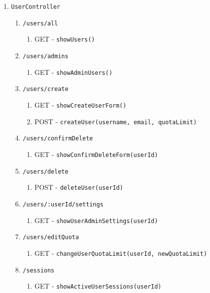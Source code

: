 \documentclass[12pt,DIV14,BCOR10mm,a4paper,parskip=half-,headsepline,headinclude,english,ngerman,bibliography=totocnumbered]{scrreprt}
\begin{document}
\begin{enumerate}
\begin{enumerate}
    \item \texttt{UserController}
    \begin{enumerate}
      \item \texttt{/users/all}
      \begin{enumerate}
        \item GET - \texttt{showUsers()}
      \end{enumerate}
      \item \texttt{/users/admins}
      \begin{enumerate}
        \item GET - \texttt{showAdminUsers()}
      \end{enumerate}
      \item \texttt{/users/create}
      \begin{enumerate}
        \item GET - \texttt{showCreateUserForm()}
        \item POST - \texttt{createUser(username, email, quotaLimit)}
      \end{enumerate}
      \item \texttt{/users/confirmDelete}
      \begin{enumerate}
        \item GET - \texttt{showConfirmDeleteForm(userId)}
      \end{enumerate}
      \item \texttt{/users/delete}
      \begin{enumerate}
        \item POST - \texttt{deleteUser(userId)}
      \end{enumerate}
      \item \texttt{/users/:userId/settings}
      \begin{enumerate}
        \item GET - \texttt{showUserAdminSettings(userId)}
      \end{enumerate}
      \item \texttt{/users/editQuota}
      \begin{enumerate}
        \item GET - \texttt{changeUserQuotaLimit(userId,
        newQuotaLimit)}
      \end{enumerate}
      \item \texttt{/sessions}
      \begin{enumerate}
        \item GET - \texttt{showActiveUserSessions(userId)}
      \end{enumerate}

\end{enumerate}
\end{enumerate}
\end{enumerate}
\end{document}
